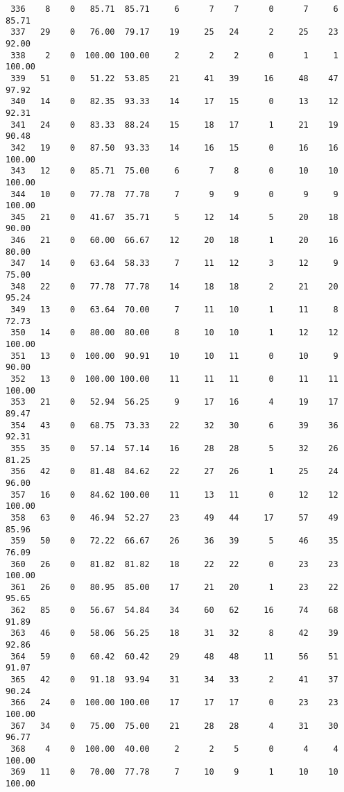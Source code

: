 \begin{verbatim}
 336    8    0   85.71  85.71     6      7    7      0      7     6    85.71
 337   29    0   76.00  79.17    19     25   24      2     25    23    92.00
 338    2    0  100.00 100.00     2      2    2      0      1     1   100.00
 339   51    0   51.22  53.85    21     41   39     16     48    47    97.92
 340   14    0   82.35  93.33    14     17   15      0     13    12    92.31
 341   24    0   83.33  88.24    15     18   17      1     21    19    90.48
 342   19    0   87.50  93.33    14     16   15      0     16    16   100.00
 343   12    0   85.71  75.00     6      7    8      0     10    10   100.00
 344   10    0   77.78  77.78     7      9    9      0      9     9   100.00
 345   21    0   41.67  35.71     5     12   14      5     20    18    90.00
 346   21    0   60.00  66.67    12     20   18      1     20    16    80.00
 347   14    0   63.64  58.33     7     11   12      3     12     9    75.00
 348   22    0   77.78  77.78    14     18   18      2     21    20    95.24
 349   13    0   63.64  70.00     7     11   10      1     11     8    72.73
 350   14    0   80.00  80.00     8     10   10      1     12    12   100.00
 351   13    0  100.00  90.91    10     10   11      0     10     9    90.00
 352   13    0  100.00 100.00    11     11   11      0     11    11   100.00
 353   21    0   52.94  56.25     9     17   16      4     19    17    89.47
 354   43    0   68.75  73.33    22     32   30      6     39    36    92.31
 355   35    0   57.14  57.14    16     28   28      5     32    26    81.25
 356   42    0   81.48  84.62    22     27   26      1     25    24    96.00
 357   16    0   84.62 100.00    11     13   11      0     12    12   100.00
 358   63    0   46.94  52.27    23     49   44     17     57    49    85.96
 359   50    0   72.22  66.67    26     36   39      5     46    35    76.09
 360   26    0   81.82  81.82    18     22   22      0     23    23   100.00
 361   26    0   80.95  85.00    17     21   20      1     23    22    95.65
 362   85    0   56.67  54.84    34     60   62     16     74    68    91.89
 363   46    0   58.06  56.25    18     31   32      8     42    39    92.86
 364   59    0   60.42  60.42    29     48   48     11     56    51    91.07
 365   42    0   91.18  93.94    31     34   33      2     41    37    90.24
 366   24    0  100.00 100.00    17     17   17      0     23    23   100.00
 367   34    0   75.00  75.00    21     28   28      4     31    30    96.77
 368    4    0  100.00  40.00     2      2    5      0      4     4   100.00
 369   11    0   70.00  77.78     7     10    9      1     10    10   100.00

\end{verbatim}
